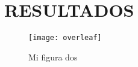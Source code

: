 \chapter{RESULTADOS}

\lipsum[1-1] \cite{texbook}

\begin{figure}[H]
    \centering
    \texttt{[image: overleaf]}
    \caption{Mi figura dos}\label{fig:fig2}
\end{figure}

